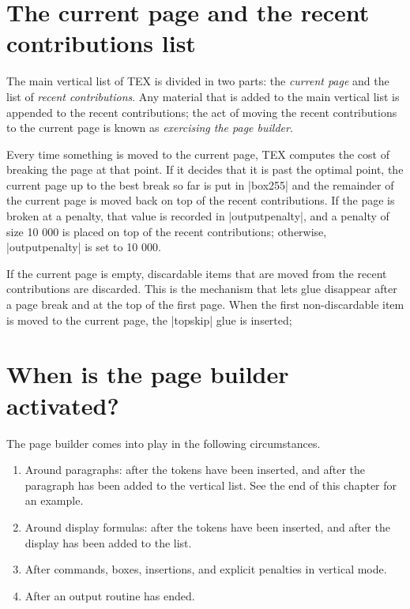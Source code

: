 \section{The current page and the recent contributions list}

The main vertical list of TEX is divided in two parts: the \emph{current page} and the list of \emph{recent
contributions}. Any material that is added to the main vertical list is appended to the recent
contributions; the act of moving the recent contributions to the current page is known as
\emph{exercising the page builder}.

Every time something is moved to the current page, TEX computes the cost of breaking the
page at that point. If it decides that it is past the optimal point, the current page up to the
best break so far is put in |box255| and the remainder of the current page is moved back
on top of the recent contributions. If the page is broken at a penalty, that value is recorded
in |outputpenalty|, and a penalty of size 10 000 is placed on top of the recent contributions;
otherwise, |outputpenalty| is set to 10 000.

If the current page is empty, discardable items that are moved from the recent contributions
are discarded. This is the mechanism that lets glue disappear after a page break and at the
top of the first page. When the first non-discardable item is moved to the current page, the
|topskip| glue is inserted; 



\section{When is the page builder activated?}


The page builder comes into play in the following circumstances.

\begin{enumerate}
\item  Around paragraphs: after the  tokens have been inserted, and after the
paragraph has been added to the vertical list. See the end of this chapter for an
example.

\item  Around display formulas: after the  tokens have been inserted, and after
the display has been added to the list.

\item  After  commands, boxes, insertions, and explicit penalties in vertical mode.

\item  After an output routine has ended.
\end{enumerate}



